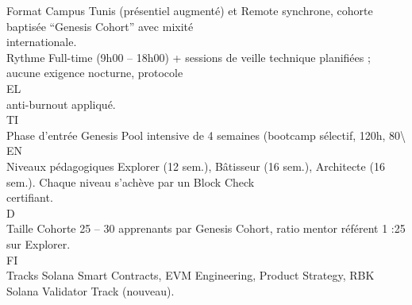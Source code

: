 \vspace{0.5em}
Format                      Campus Tunis (présentiel augmenté) et Remote synchrone, cohorte baptisée “Genesis Cohort” avec mixité\\
internationale.\\
\vspace{0.5em}
Rythme                      Full-time (9h00 – 18h00) + sessions de veille technique planifiées ; aucune exigence nocturne, protocole\\
\vspace{0.5em}
\vspace{0.5em}
\vspace{0.5em}
\vspace{0.5em}
EL\\
anti-burnout appliqué.\\
\vspace{0.5em}
\vspace{0.5em}
\vspace{0.5em}
\vspace{0.5em}
TI\\
Phase d’entrée              Genesis Pool intensive de 4 semaines (bootcamp sélectif, 120h, 80\textbackslash{}%
\vspace{0.5em}
\vspace{0.5em}
\vspace{0.5em}
\vspace{0.5em}
EN\\
Niveaux pédagogiques        Explorer (12 sem.), Bâtisseur (16 sem.), Architecte (16 sem.). Chaque niveau s’achève par un Block Check\\
certifiant.\\
\vspace{0.5em}
\vspace{0.5em}
\vspace{0.5em}
\vspace{0.5em}
D\\
Taille Cohorte              25 – 30 apprenants par Genesis Cohort, ratio mentor référent 1 :25 sur Explorer.\\
\vspace{0.5em}
\vspace{0.5em}
\vspace{0.5em}
\vspace{0.5em}
FI\\
Tracks                      Solana Smart Contracts, EVM Engineering, Product Strategy, RBK Solana Validator Track (nouveau).\\
